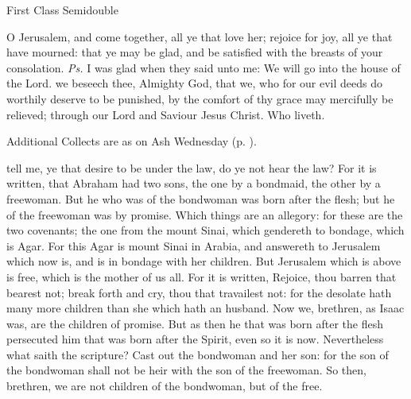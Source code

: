\begin{inhead}
{First Class Semidouble}
\end{inhead}
\par\noindent
{}


\introit
{} O Jerusalem, and come together, all ye that love her; rejoice for joy, all ye that have mourned: that ye may be glad, and be satisfied with the breasts of your consolation. \textit{Ps.} I was glad when they said unto me: We will go into the house of the Lord.
\collect
{} we beseech thee, Almighty God, that we, who for our evil deeds do worthily deserve to be punished, by the comfort of thy grace may mercifully be relieved; through our Lord and Saviour Jesus Christ. Who liveth.
\begin{rubric}
    Additional Collects are as on Ash Wednesday (p. \pageref{AshWednesdayMass}).
\end{rubric}
 tell me, ye that desire to be under the law, do ye not hear the law? For it is written, that Abraham had two sons, the one by a bondmaid, the other by a freewoman. But he who was of the bondwoman was born after the flesh; but he of the freewoman was by promise. Which things are an allegory: for these are the two covenants; the one from the mount Sinai, which gendereth to bondage, which is Agar. For this Agar is mount Sinai in Arabia, and answereth to Jerusalem which now is, and is in bondage with her children. But Jerusalem which is above is free, which is the mother of us all. For it is written, Rejoice, thou barren that bearest not; break forth and cry, thou that travailest not: for the desolate hath many more children than she which hath an husband. Now we, brethren, as Isaac was, are the children of promise. But as then he that was born after the flesh persecuted him that was born after the Spirit, even so it is now. Nevertheless what saith the scripture? Cast out the bondwoman and her son: for the son of the bondwoman shall not be heir with the son of the freewoman. So then, brethren, we are not children of the bondwoman, but of the free.

